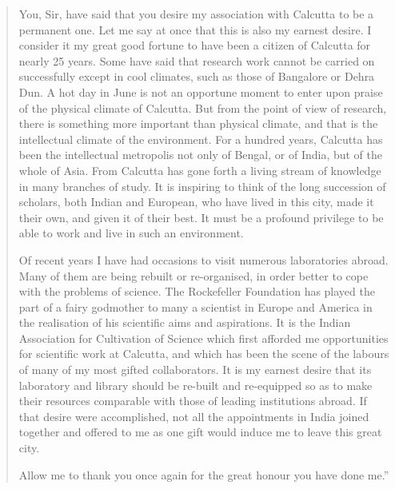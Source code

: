 \begin{quote}
{You, Sir, have said that you desire my association with
Calcutta to be a permanent one. Let me say at once that this is
also my earnest desire. I consider it my great good fortune to have
been a citizen of Calcutta for nearly 25 years. Some have said
that research work cannot be carried on successfully except in cool
climates, such as those of Bangalore or Dehra Dun. A hot day
in June is not an opportune moment to enter upon praise of the
physical climate of Calcutta. But from the point of view of
research, there is something more important than physical climate,
and that is the intellectual climate of the environment. For a
hundred years, Calcutta has been the intellectual metropolis
not only of Bengal, or of India, but of the whole of Asia.
From Calcutta has gone forth a living stream of knowledge in
many branches of study. It is inspiring to think of the long
succession of scholars, both Indian and European, who have lived
in this city, made it their own, and given it of their best. It must
be a profound privilege to be able to work and live in such an
environment.

Of recent years I have had occasions to visit numerous
laboratories abroad. Many of them are being rebuilt or re-organised, 
in order better to cope with the problems of science. 
The Rockefeller Foundation has played the part of a fairy
godmother to many a scientist in Europe and America in the
realisation of his scientific aims and aspirations. It is the Indian
Association for Cultivation of Science which first afforded me
opportunities for scientific work at Calcutta, and which has been
the scene of the labours of many of my most gifted collaborators.
It is my earnest desire that its laboratory and library should be re-built and re-equipped so as to make their resources comparable
with those of leading institutions abroad. If that desire were
accomplished, not all the appointments in India joined together
and offered to me as one gift would induce me to leave
this great city.

Allow me to thank you once again for the great honour you
have done me.''}\relax
\end{quote}

